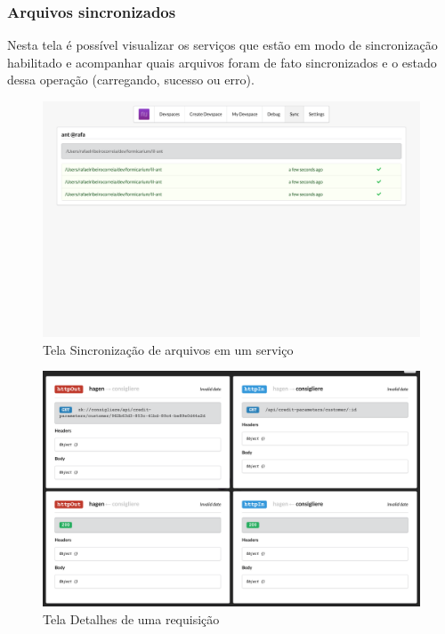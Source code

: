         \subsubsection{Arquivos sincronizados}
        Nesta tela é possível visualizar os serviços que estão em modo de sincronização habilitado e acompanhar quais arquivos foram de fato sincronizados e o estado dessa operação (carregando, sucesso ou erro).
    
        \begin{figure}[htb]
          \caption{\label{fig_frontend_sync}Tela Sincronização de arquivos em um serviço}
          \begin{center}
          \includegraphics[width=\textwidth,keepaspectratio]{pictures/frontend/frontend-sync.png}
          \end{center}
        \end{figure}
    	
        \begin{figure}[htb]
    		\caption{\label{fig_frontend_tracing_details}Tela Detalhes de uma requisição}
    		\begin{center}
    		\includegraphics[width=\textwidth,keepaspectratio]{pictures/frontend/frontend-tracing-details.png}
    		\end{center}
    	\end{figure}
    	
